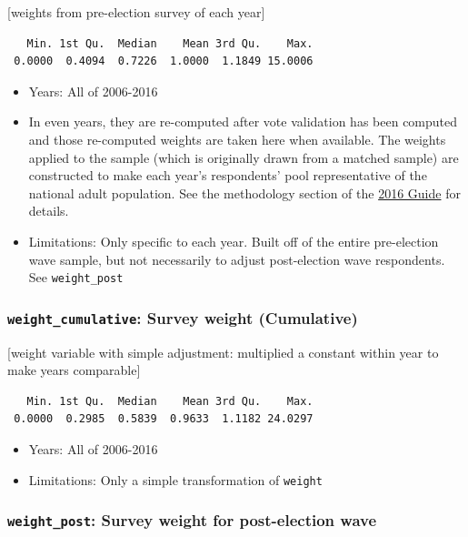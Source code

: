 \documentclass[10pt,article,oneside]{memoir}
\theoremstyle{definition}
\begin{document}
{[}weights from pre-election survey of each year{]}

\begin{verbatim}
   Min. 1st Qu.  Median    Mean 3rd Qu.    Max. 
 0.0000  0.4094  0.7226  1.0000  1.1849 15.0006 
\end{verbatim}

\begin{itemize}
\tightlist
\item
  Years: All of 2006-2016
\item
  In even years, they are re-computed after vote validation has been
  computed and those re-computed weights are taken here when available.
  The weights applied to the sample (which is originally drawn from a
  matched sample) are constructed to make each year's respondents' pool
  representative of the national adult population. See the methodology
  section of the
  \href{https://dataverse.harvard.edu/api/access/datafile/3047286}{2016
  Guide} for details.
\item
  Limitations: Only specific to each year. Built off of the entire
  pre-election wave sample, but not necessarily to adjust post-election
  wave respondents. See \texttt{weight\_post}
\end{itemize}

\subsubsection{\texorpdfstring{\texttt{weight\_cumulative}: Survey
weight
(Cumulative)}{weight\_cumulative: Survey weight (Cumulative)}}\label{weight_cumulative-survey-weight-cumulative}

{[}weight variable with simple adjustment: multiplied a constant within
year to make years comparable{]}

\begin{verbatim}
   Min. 1st Qu.  Median    Mean 3rd Qu.    Max. 
 0.0000  0.2985  0.5839  0.9633  1.1182 24.0297 
\end{verbatim}

\begin{itemize}
\tightlist
\item
  Years: All of 2006-2016
\item
  Limitations: Only a simple transformation of \texttt{weight}
\end{itemize}

\subsubsection{\texorpdfstring{\texttt{weight\_post}: Survey weight for
post-election
wave}{weight\_post: Survey weight for post-election wave}}\label{weight_post-survey-weight-for-post-election-wave}
\end{document}
